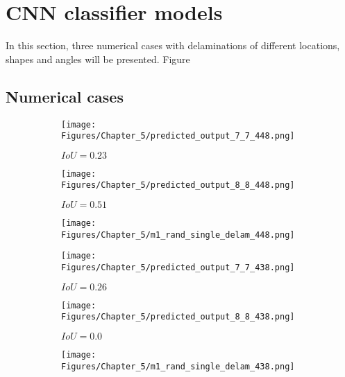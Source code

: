 \section{CNN classifier models}
\label{sec51}

In this section, three numerical cases with delaminations of different locations, shapes and angles will be presented.
Figure

\subsection{Numerical cases}
\label{sec511}

\begin{figure} [h!]
	\centering
	\begin{subfigure}[b]{0.32\textwidth}
		\centering
		\texttt{[image: Figures/Chapter\_5/predicted\_output\_7\_7\_448.png]}
		\caption{\(IoU=0.23\)}
		\label{fig:pred_7_7_case_448}
	\end{subfigure}
	\hfill
	\begin{subfigure}[b]{0.32\textwidth}
		\centering
		\texttt{[image: Figures/Chapter\_5/predicted\_output\_8\_8\_448.png]}
		\caption{\(IoU=0.51\)}
		\label{fig:pred_8_8_case_448}
	\end{subfigure}
	\hfill
	\begin{subfigure}[b]{0.32\textwidth}
		\centering
		\texttt{[image: Figures/Chapter\_5/m1\_rand\_single\_delam\_448.png]}
		\caption{}
		\label{fig:GT_case_448}
	\end{subfigure}	
	\par\medskip
	\begin{subfigure}[b]{0.32\textwidth}
		\centering
		\texttt{[image: Figures/Chapter\_5/predicted\_output\_7\_7\_438.png]}
		\caption{\(IoU=0.26\)}
		\label{fig:pred_7_7_case_438}
	\end{subfigure}
	\hfill
	\begin{subfigure}[b]{0.32\textwidth}
		\centering
		\texttt{[image: Figures/Chapter\_5/predicted\_output\_8\_8\_438.png]}
		\caption{\(IoU=0.0\)}
		\label{fig:pred_8_8_case_438}
	\end{subfigure}
	\hfill
	\begin{subfigure}[b]{0.32\textwidth}
		\centering
		\texttt{[image: Figures/Chapter\_5/m1\_rand\_single\_delam\_438.png]}
		\caption{}
		\label{fig:GT_case_438}
	\end{subfigure}

\end{figure}
